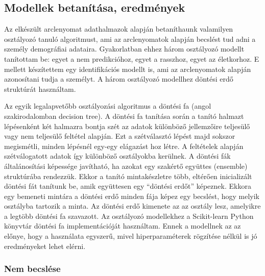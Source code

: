 \subsection{Modellek betanítása, eredmények}  %


Az elkészült arclenyomat adathalmazok alapján betaníthaunk valamilyen osztályozó tanuló algoritmust, ami az arclenyomatok alapján becslést tud adni a személy demográfiai adataira. Gyakorlatban ehhez három osztályozó modellt tanítottam be: egyet a nem predikcióhoz, egyet a rasszhoz, egyet az életkorhoz. E mellett készítettem egy identifikációs modellt is, ami az arclenyomatok alapján azonosítani tudja a személyt. A három osztályozó modellhez döntési erdő struktúrát használtam.

Az egyik legalapvetőbb osztályozási algoritmus a döntési fa (angol szakirodalomban decision tree). A döntési fa tanítása során a tanító halmazt lépésenként két halmazra bontja szét az adatok különböző jellemzőire teljesülő vagy nem teljesülő feltétel alapján. Ezt a szétválasztó lépést majd sokszor megismétli, minden lépésnél egy-egy elágazást hoz létre. A feltételek alapján szétválogatott adatok így különböző osztályokba kerülnek. A döntési fák általánosítási képessége javítható, ha azokat egy szakértő együttes (ensemble) struktúrába rendezzük. Ekkor a tanító mintakészletre több, eltérően inicializált döntési fát tanítunk be, amik együttesen egy ``döntési erdőt'' képeznek. Ekkora egy bemeneti mintára a döntési erdő minden fája képez egy becslést, hogy melyik osztályba tartozik a minta. Az döntési erdő kimenete az az osztály lesz, amelyikre a legtöbb döntési fa szavazott. Az osztályozó modellekhez a Scikit-learn Python könyvtár döntési fa implementációját használtam. Ennek a modellnek az az előnye, hogy a használata egyszerű, mivel hiperparaméterek rögzítése nélkül is jó eredményeket lehet elérni.

\subsubsection*{Nem becslése}

